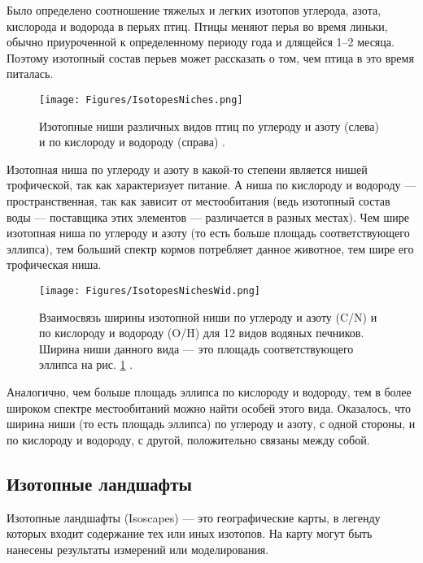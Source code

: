 \documentclass[a5paper,openany]{book}
\begin{document}
Было определено соотношение тяжелых и легких изотопов углерода, азота, кислорода и водорода в  перьях птиц. Птицы меняют перья во время линьки, обычно приуроченной к определенному периоду года и длящейся 1–2 месяца. Поэтому изотопный состав перьев может рассказать о том, чем птица в это время питалась. 
\begin{figure}[ht] 
\centering\small
\unitlength=1mm
{\texttt{[image: Figures/IsotopesNiches.png]}} 
\caption{Изотопные ниши различных видов птиц по углероду и азоту (слева) и по кислороду и водороду (справа) \cite{Rader2017}.} 
\label{f:IsotopesNiches}
\end{figure}


Изотопная ниша по углероду и азоту в какой-то степени является нишей трофической, так как характеризует питание. А ниша по кислороду и водороду — пространственная, так как зависит от местообитания (ведь изотопный состав воды — поставщика этих элементов — различается в разных местах). Чем шире изотопная ниша по углероду и азоту (то есть больше площадь соответствующего эллипса), тем больший спектр кормов потребляет данное животное, тем шире его трофическая ниша. 

\begin{figure}[ht] 
\centering\small
\unitlength=1mm
{\texttt{[image: Figures/IsotopesNichesWid.png]}} 
\caption{Взаимосвязь ширины изотопной ниши по углероду и азоту (C/N) и по кислороду и водороду (O/H) для 12 видов водяных печников. Ширина ниши данного вида — это площадь соответствующего эллипса на рис. \ref{f:IsotopesNiches} \cite{Rader2017}.} 
\label{f:IsotopesNichesWid}
\end{figure}

Аналогично, чем больше площадь эллипса по кислороду и водороду, тем в более широком спектре местообитаний можно найти особей этого вида. Оказалось, что ширина ниши (то есть площадь эллипса) по углероду и азоту, с одной стороны, и по кислороду и водороду, с другой, положительно связаны между собой.


\subsection{ Изотопные ландшафты }\label{s:IsoScapes}

Изотопные ландшафты (Isoscapes) --- это географические карты, в легенду которых входит содержание тех или иных изотопов. На карту могут быть нанесены результаты измерений или моделирования. 
\end{document}
